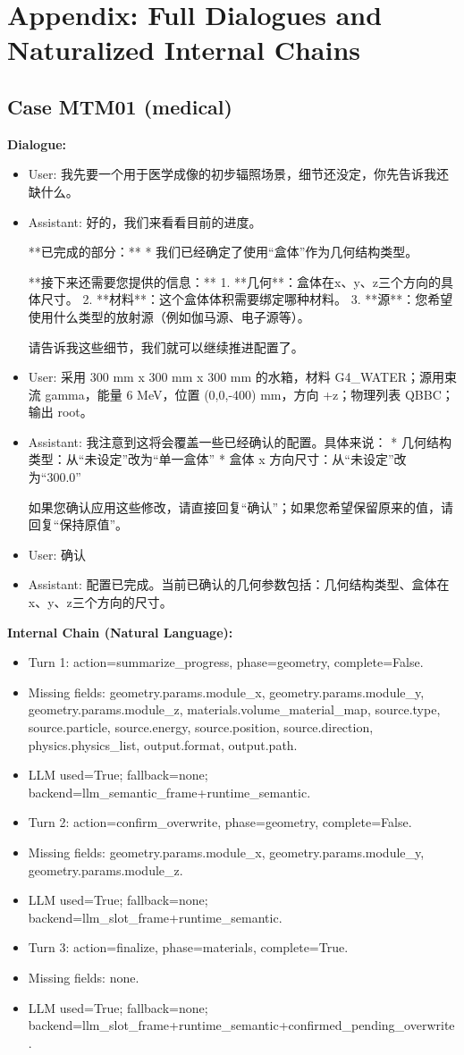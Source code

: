 \documentclass[11pt]{ctexart}
\begin{document}
\section{Appendix: Full Dialogues and Naturalized Internal Chains}
\subsection{Case MTM01 (medical)}
\textbf{Dialogue:}
\begin{itemize}
\item User: 我先要一个用于医学成像的初步辐照场景，细节还没定，你先告诉我还缺什么。
\item Assistant: 好的，我们来看看目前的进度。

**已完成的部分：**
*   我们已经确定了使用“盒体”作为几何结构类型。

**接下来还需要您提供的信息：**
1.  **几何**：盒体在x、y、z三个方向的具体尺寸。
2.  **材料**：这个盒体体积需要绑定哪种材料。
3.  **源**：您希望使用什么类型的放射源（例如伽马源、电子源等）。

请告诉我这些细节，我们就可以继续推进配置了。
\item User: 采用 300 mm x 300 mm x 300 mm 的水箱，材料 G4\_WATER；源用束流 gamma，能量 6 MeV，位置 (0,0,-400) mm，方向 +z；物理列表 QBBC；输出 root。
\item Assistant: 我注意到这将会覆盖一些已经确认的配置。具体来说：
*   几何结构类型：从“未设定”改为“单一盒体”
*   盒体 x 方向尺寸：从“未设定”改为“300.0”

如果您确认应用这些修改，请直接回复“确认”；如果您希望保留原来的值，请回复“保持原值”。
\item User: 确认
\item Assistant: 配置已完成。当前已确认的几何参数包括：几何结构类型、盒体在x、y、z三个方向的尺寸。
\end{itemize}
\textbf{Internal Chain (Natural Language):}
\begin{itemize}
\item Turn 1: action=summarize\_progress, phase=geometry, complete=False.
\item Missing fields: geometry.params.module\_x, geometry.params.module\_y, geometry.params.module\_z, materials.volume\_material\_map, source.type, source.particle, source.energy, source.position, source.direction, physics.physics\_list, output.format, output.path.
\item LLM used=True; fallback=none; backend=llm\_semantic\_frame+runtime\_semantic.
\item Turn 2: action=confirm\_overwrite, phase=geometry, complete=False.
\item Missing fields: geometry.params.module\_x, geometry.params.module\_y, geometry.params.module\_z.
\item LLM used=True; fallback=none; backend=llm\_slot\_frame+runtime\_semantic.
\item Turn 3: action=finalize, phase=materials, complete=True.
\item Missing fields: none.
\item LLM used=True; fallback=none; backend=llm\_slot\_frame+runtime\_semantic+confirmed\_pending\_overwrite.
\end{itemize}
\end{document}
